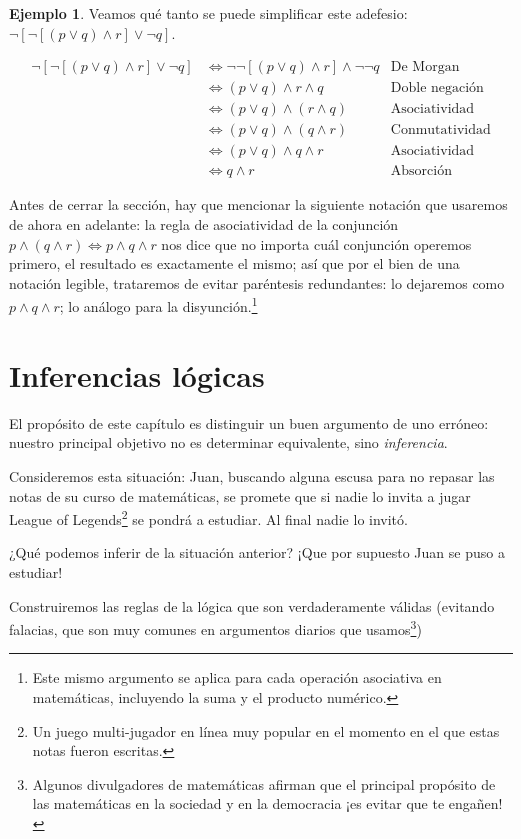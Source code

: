 \documentclass{book}
\theoremstyle{definition}
\newtheorem{ejm}{Ejemplo}[chapter]
\begin{document}
\begin{ejm}
	Veamos qué tanto se puede simplificar este adefesio: $\neg \left[\neg \left[ (p\vee q)\wedge r\right]\vee \neg q \right]$.
	
	\begin{align*}
		\neg \left[\neg \left[ (p\vee q)\wedge r\right]\vee \neg q \right] & \iff \neg \neg \left[ (p\vee q)\wedge r\right] \wedge \neg \neg q & \text{De Morgan} \\
		& \iff  (p\vee q)\wedge r \wedge q & \text{Doble negación}\\
		& \iff (p \vee q)\wedge (r \wedge q) & \text{Asociatividad}\\
		& \iff (p\vee q)\wedge (q \wedge r) & \text{Conmutatividad}\\
		& \iff (p\vee q)\wedge q \wedge r & \text{Asociatividad}\\
		& \iff q \wedge r & \text{Absorción}
	\end{align*}
\end{ejm}
Antes de cerrar la sección, hay que mencionar la siguiente notación que usaremos de ahora en adelante:
la regla de asociatividad de la conjunción $p \wedge (q \wedge r) \iff p \wedge q \wedge r$ nos dice que no importa cuál conjunción operemos primero, el resultado es exactamente el mismo; así que por el bien de una notación legible, trataremos de evitar paréntesis redundantes: lo dejaremos como $p \wedge q \wedge r$; lo análogo para la disyunción.\footnote{Este mismo argumento se aplica para cada operación asociativa en matemáticas, incluyendo la suma y el producto numérico.}

\section{Inferencias lógicas}
\label{sc_inferenciasLogicas}
El propósito de este capítulo es distinguir un buen argumento de uno erróneo: nuestro principal objetivo no es determinar equivalente, sino \emph{inferencia}.

Consideremos esta situación: Juan, buscando alguna escusa para no repasar las notas de su curso de matemáticas, se promete que si nadie lo invita a jugar League of Legends\footnote{Un juego multi-jugador en línea muy popular en el momento en el que estas notas fueron escritas.} se pondrá a estudiar. Al final nadie lo invitó.

¿Qué podemos inferir de la situación anterior? ¡Que por supuesto Juan se puso a estudiar!

Construiremos las reglas de la lógica que son verdaderamente válidas (evitando falacias, que son muy comunes en argumentos diarios que usamos\footnote{Algunos divulgadores de matemáticas afirman que el principal propósito de las matemáticas en la sociedad y en la democracia ¡es evitar que te engañen!})
\end{document}
